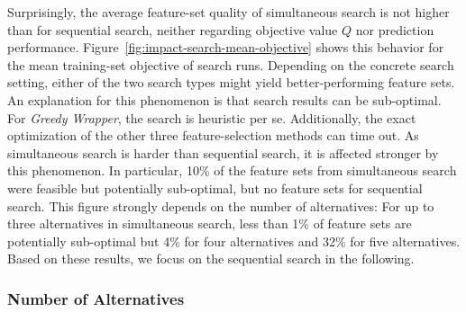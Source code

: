 \documentclass{article}
\theoremstyle{definition}
\begin{document}
Surprisingly, the average feature-set quality of simultaneous search is not higher than for sequential search, neither regarding objective value $Q$ nor prediction performance.
Figure~\ref{fig:impact-search-mean-objective} shows this behavior for the mean training-set objective of search runs.
Depending on the concrete search setting, either of the two search types might yield better-performing feature sets.
An explanation for this phenomenon is that search results can be sub-optimal.
For \emph{Greedy Wrapper}, the search is heuristic per se.
Additionally, the exact optimization of the other three feature-selection methods can time out.
As simultaneous search is harder than sequential search, it is affected stronger by this phenomenon.
In particular, 10\% of the feature sets from simultaneous search were feasible but potentially sub-optimal, but no feature sets for sequential search.
This figure strongly depends on the number of alternatives:
For up to three alternatives in simultaneous search, less than 1\% of feature sets are potentially sub-optimal but 4\% for four alternatives and 32\% for five alternatives.
Based on these results, we focus on the sequential search in the following.

\subsubsection{Number of Alternatives}
\end{document}

